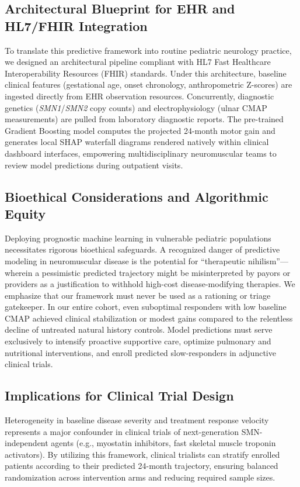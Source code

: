 \documentclass[journal]{IEEEtran}
\begin{document}
\subsection{Architectural Blueprint for EHR and HL7/FHIR Integration}
To translate this predictive framework into routine pediatric neurology practice, we designed an architectural pipeline compliant with HL7 Fast Healthcare Interoperability Resources (FHIR) standards. Under this architecture, baseline clinical features (gestational age, onset chronology, anthropometric Z-scores) are ingested directly from EHR observation resources. Concurrently, diagnostic genetics (\textit{SMN1}/\textit{SMN2} copy counts) and electrophysiology (ulnar CMAP measurements) are pulled from laboratory diagnostic reports. The pre-trained Gradient Boosting model computes the projected 24-month motor gain and generates local SHAP waterfall diagrams rendered natively within clinical dashboard interfaces, empowering multidisciplinary neuromuscular teams to review model predictions during outpatient visits.

\subsection{Bioethical Considerations and Algorithmic Equity}
Deploying prognostic machine learning in vulnerable pediatric populations necessitates rigorous bioethical safeguards. A recognized danger of predictive modeling in neuromuscular disease is the potential for ``therapeutic nihilism''---wherein a pessimistic predicted trajectory might be misinterpreted by payors or providers as a justification to withhold high-cost disease-modifying therapies. We emphasize that our framework must never be used as a rationing or triage gatekeeper. In our entire cohort, even suboptimal responders with low baseline CMAP achieved clinical stabilization or modest gains compared to the relentless decline of untreated natural history controls. Model predictions must serve exclusively to intensify proactive supportive care, optimize pulmonary and nutritional interventions, and enroll predicted slow-responders in adjunctive clinical trials.

\subsection{Implications for Clinical Trial Design}
Heterogeneity in baseline disease severity and treatment response velocity represents a major confounder in clinical trials of next-generation SMN-independent agents (e.g., myostatin inhibitors, fast skeletal muscle troponin activators). By utilizing this framework, clinical trialists can stratify enrolled patients according to their predicted 24-month trajectory, ensuring balanced randomization across intervention arms and reducing required sample sizes.
\end{document}
